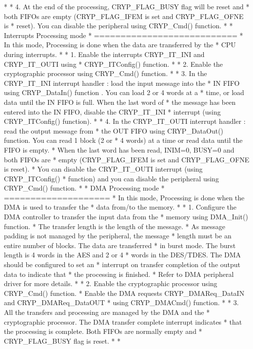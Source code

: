 \begin{DoxyVerb}
*
*    4. At the end of the processing, CRYP_FLAG_BUSY flag will be reset and 
*        both FIFOs are empty (CRYP_FLAG_IFEM is set and CRYP_FLAG_OFNE is 
*        reset). You can disable the peripheral using CRYP_Cmd() function.
*
*    Interrupts Processing mode 
*    ===========================
*    In this mode, Processing is done when the data are transferred by the 
*    CPU during interrupts.
*
*    1. Enable the interrupts CRYP_IT_INI and CRYP_IT_OUTI using 
*       CRYP_ITConfig() function.
*
*    2. Enable the cryptographic processor using CRYP_Cmd() function.
*
*    3. In the CRYP_IT_INI interrupt handler : load the input message into the 
*       IN FIFO using CRYP_DataIn() function . You can load 2 or 4 words at a 
*       time, or load data until the IN FIFO is full. When the last word of
*       the message has been entered into the IN FIFO, disable the CRYP_IT_INI 
*       interrupt (using CRYP_ITConfig() function).
*
*    4. In the CRYP_IT_OUTI interrupt handler : read the output message from 
*       the OUT FIFO using CRYP_DataOut() function. You can read 1 block (2 or 
*       4 words) at a time or read data until the FIFO is empty.
*       When the last word has been read, INIM=0, BUSY=0 and both FIFOs are 
*       empty (CRYP_FLAG_IFEM is set and CRYP_FLAG_OFNE is reset). 
*       You can disable the CRYP_IT_OUTI interrupt (using CRYP_ITConfig() 
*       function) and you can disable the peripheral using CRYP_Cmd() function.
*
*    DMA Processing mode 
*    ====================
*    In this mode, Processing is done when the DMA is used to transfer the 
*    data from/to the memory.
*
*    1. Configure the DMA controller to transfer the input data from the 
*       memory using DMA_Init() function. 
*       The transfer length is the length of the message. 
*       As message padding is not managed by the peripheral, the message 
*       length must be an entire number of blocks. The data are transferred 
*       in burst mode. The burst length is 4 words in the AES and 2 or 4 
*       words in the DES/TDES. The DMA should be configured to set an 
*       interrupt on transfer completion of the output data to indicate that 
*       the processing is finished. 
*       Refer to DMA peripheral driver for more details.  
*
*    2. Enable the cryptographic processor using CRYP_Cmd() function. 
*       Enable the DMA requests CRYP_DMAReq_DataIN and CRYP_DMAReq_DataOUT 
*       using CRYP_DMACmd() function.
*
*    3. All the transfers and processing are managed by the DMA and the 
*       cryptographic processor. The DMA transfer complete interrupt indicates 
*       that the processing is complete. Both FIFOs are normally empty and 
*       CRYP_FLAG_BUSY flag is reset.
*
*  \end{DoxyVerb}



